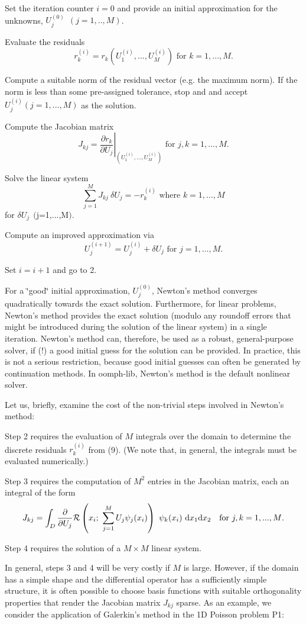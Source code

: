 \begin{DoxyEnumerate}
\item Set the iteration counter $i=0$ and provide an initial approximation for the unknowns, $ U^{(0)}_j\ \ (j=1,..,M)$.
\item Evaluate the residuals \[ r_k^{(i)} = r_k\left( U^{(i)}_1,..., U^{(i)}_M\right) \mbox{\ \ \ for $k=1,...,M$}. \]
\item Compute a suitable norm of the residual vector (e.\-g. the maximum norm). If the norm is less than some pre-\/assigned tolerance, stop and and accept $U_j^{(i)} (j=1,...,M) $ as the solution.
\item Compute the Jacobian matrix \[ J_{kj} = \left. \frac{\partial r_k}{\partial U_j} \right|_{\left( U^{(i)}_1,..., U^{(i)}_M\right)} \mbox{\ \ \ for $j,k=1,...,M$}.\]
\item Solve the linear system \[ \sum_{j=1}^{M} J_{kj} \ \delta U_j = - r_k^{(i)} \mbox{\ \ \ \ \ \ where $k=1,...,M$} \] for $ \delta U_{j} \ \ ($j=1,...,M$).$
\item Compute an improved approximation via \[ U_j^{(i+1)} = U_j^{(i)} + \delta U_j \mbox{\ \ \ for $j=1,...,M$}. \]
\item Set $ i=i+1$ and go to 2.
\end{DoxyEnumerate}For a \char`\"{}good\char`\"{} initial approximation, $ U^{(0)}_j$, Newton's method converges quadratically towards the exact solution. Furthermore, for linear problems, Newton's method provides the exact solution (modulo any roundoff errors that might be introduced during the solution of the linear system) in a single iteration. Newton's method can, therefore, be used as a robust, general-\/purpose solver, if (!) a good initial guess for the solution can be provided. In practice, this is not a serious restriction, because good initial guesses can often be generated by continuation methods. In {\ttfamily oomph-\/lib}, Newton's method is the default nonlinear solver.

Let us, briefly, examine the cost of the non-\/trivial steps involved in Newton's method\-:
\begin{DoxyItemize}
\item Step 2 requires the evaluation of $M$ integrals over the domain to determine the discrete residuals $ r_k^{(i)} $ from (9). (We note that, in general, the integrals must be evaluated numerically.)
\item Step 3 requires the computation of $M^2$ entries in the Jacobian matrix, each an integral of the form \[ J_{kj} = \int_{D} \frac{\partial }{\partial U_j} {\cal R}\left(x_i; \ \sum_{j=1}^{M} U_j \psi_j(x_i)\right) \ \psi_k(x_i) \ \mbox{d}x_1 \mbox{d}x_2 \mbox{\ \ \ for $j,k=1,...,M$.} \]
\item Step 4 requires the solution of a $M \times M$ linear system.
\end{DoxyItemize}In general, steps 3 and 4 will be very costly if $M$ is large. However, if the domain has a simple shape and the differential operator has a sufficiently simple structure, it is often possible to choose basis functions with suitable orthogonality properties that render the Jacobian matrix $J_{kj}$ sparse. As an example, we consider the application of Galerkin's method in the 1\-D Poisson problem P1\-:

